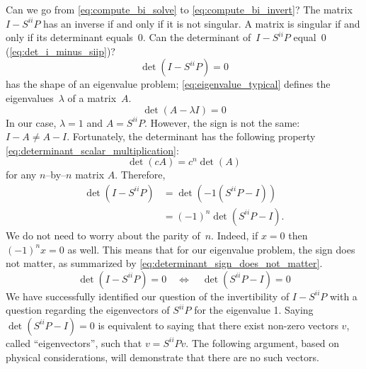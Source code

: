 Can we go from \cref{eq:compute_bi_solve} to \cref{eq:compute_bi_invert}?
The matrix~$I - S^{ii}P$ has an inverse if and only if it is not singular.
A matrix is singular if and only if its determinant equals~0.
Can the determinant of~$I - S^{ii}P$ equal~0 (\cref{eq:det_i_minus_siip})?
\begin{equation}
    \det(I - S^{ii}P) = 0 \label{eq:det_i_minus_siip}
\end{equation}
 has the shape of an eigenvalue problem;
\cref{eq:eigenvalue_typical} defines the eigenvalues~$\lambda$ of a matrix~$A$.
\begin{equation}
    \det(A - \lambda I) = 0 \label{eq:eigenvalue_typical}
\end{equation}
In our case, $\lambda=1$ and $A=S^{ii}P$.
However, the sign is not the same: $I-A \neq A-I$.
Fortunately, the determinant has the following property \cref{eq:determinant_scalar_multiplication}:
\begin{equation}
    \det(c A) = c^n \det(A) \label{eq:determinant_scalar_multiplication}
\end{equation}
for any $n$--by--$n$ matrix $A$.
Therefore,
\begin{subequations}
    \begin{align}
        \det(I - S^{ii}P)
        &= \det(-1(S^{ii}P - I)) \\
        &= (-1)^n \det(S^{ii}P - I) \text{.}
    \end{align}
\end{subequations}
We do not need to worry about the parity of~$n$.
Indeed, if $x=0$ then $(-1)^n x = 0$ as well.
This means that for our eigenvalue problem, the sign does not matter, as summarized by \cref{eq:determinant_sign_does_not_matter}.
\begin{equation}
    \det(I - S^{ii}P) = 0
    \quad
    \Longleftrightarrow
    \quad
    \det(S^{ii}P - I) = 0
    \label{eq:determinant_sign_does_not_matter}
\end{equation}
We have successfully identified our question of the invertibility of $I - S^{ii}P$ with a question regarding the eigenvectors of $S^{ii}P$ for the eigenvalue 1.
Saying $\det(S^{ii}P - I) = 0$ is equivalent to saying that there exist non-zero vectors $v$, called ``eigenvectors'', such that $v = S^{ii}Pv$.
The following argument, based on physical considerations, will demonstrate that there are no such vectors.

